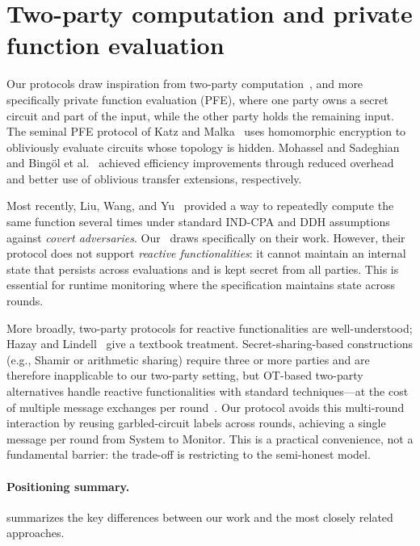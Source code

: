 \section{Two-party computation and private function evaluation}\label{sec:pfe-related}

Our protocols draw inspiration from two-party computation~\cite{GMW87,Yao82}, and more specifically private function evaluation (PFE), where one party owns a secret circuit and part of the input, while the other party holds the remaining input. The seminal PFE protocol of Katz and Malka~\cite{KM11} uses homomorphic encryption to obliviously evaluate circuits whose topology is hidden. Mohassel and Sadeghian~\cite{MS13} and Bingöl et al.~\cite{BBKL19} achieved efficiency improvements through reduced overhead and better use of oblivious transfer extensions, respectively.

Most recently, Liu, Wang, and Yu~\cite{LWY22} provided a way to repeatedly compute the same function several times under standard IND-CPA and DDH assumptions against \emph{covert adversaries}. Our \protocoltwo~draws specifically on their work. However, their protocol does not support \emph{reactive functionalities}: it cannot maintain an internal state that persists across evaluations and is kept secret from all parties. This is essential for runtime monitoring where the specification maintains state across rounds.

More broadly, two-party protocols for reactive functionalities are well-understood; Hazay and Lindell~\cite{HL10} give a textbook treatment. Secret-sharing-based constructions (e.g., Shamir or arithmetic sharing) require three or more parties and are therefore inapplicable to our two-party setting, but OT-based two-party alternatives handle reactive functionalities with standard techniques---at the cost of multiple message exchanges per round~\cite{CSW20}. Our protocol avoids this multi-round interaction by reusing garbled-circuit labels across rounds, achieving a single message per round from System to Monitor. This is a practical convenience, not a fundamental barrier: the trade-off is restricting to the semi-honest model.

\paragraph{Positioning summary.}
 summarizes the key differences between our work and the most closely related approaches.

